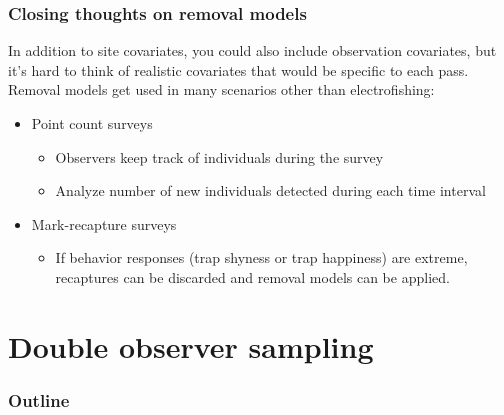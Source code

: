 \documentclass[color=usenames,dvipsnames]{beamer}\usepackage[]{graphicx}\usepackage[]{xcolor}
\begin{document}
\begin{frame}
  \frametitle{Closing thoughts on removal models}
  In addition to site covariates, you could also include observation
  covariates, but it's hard to think of realistic covariates that
  would be specific to each pass. \\
  \pause
  \vfill
  Removal models get used in many scenarios other than electrofishing:
  \begin{itemize}
    \item<2-> Point count surveys
    \begin{itemize}
      \item Observers keep track of individuals during the survey
      \item Analyze number of new individuals detected during each
        time interval
    \end{itemize}
    \item<3-> Mark-recapture surveys
      \begin{itemize}
        \item If behavior responses (trap shyness or trap happiness)
          are extreme, recaptures can be discarded and removal models
          can be applied.
      \end{itemize}
  \end{itemize}
\end{frame}




\section{Double observer sampling}

\begin{frame}
  \frametitle{Outline}
  \Large
\end{frame}
\end{document}
